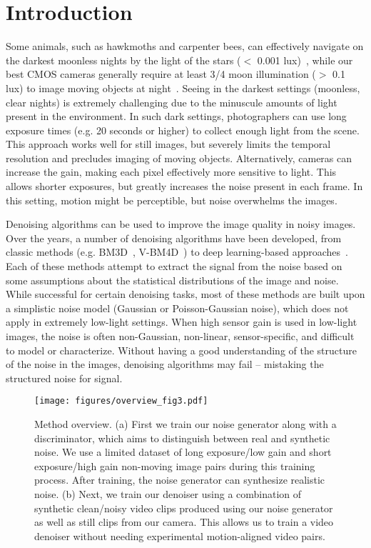 \documentclass[final]{cvpr}
\begin{document}
\section{Introduction}
Some animals, such as hawkmoths and carpenter bees, can effectively navigate on the darkest moonless nights by the light of the stars ($<$ 0.001 lux)~\cite{somanathan2008visual, warrant2004vision, kelber2002scotopic}, while our best CMOS cameras generally require at least 3/4 moon illumination ($>$ 0.1 lux) to image moving objects at night~\cite{nightonearth}. Seeing in the darkest settings (moonless, clear nights) is extremely challenging due to the minuscule amounts of light present in the environment. In such dark settings, photographers can use long exposure times (e.g. 20 seconds or higher) to collect enough light from the scene. This approach works well for still images, but severely limits the temporal resolution and precludes imaging of moving objects. Alternatively, cameras can increase the gain, making each pixel effectively more sensitive to light. This allows shorter exposures, but greatly increases the noise present in each frame. In this setting, motion might be perceptible, but noise overwhelms the images.

Denoising algorithms can be used to improve the image quality in noisy images. Over the years, a number of denoising algorithms have been developed, from classic methods (e.g. BM3D~\cite{dabov2007image}, V-BM4D~\cite{maggioni2012video}) to deep learning-based approaches~\cite{zhang2017beyond}. Each of these methods attempt to extract the signal from the noise based on some assumptions about the statistical distributions of the image and noise. While successful for certain denoising tasks, most of these methods are built upon a simplistic noise model (Gaussian or Poisson-Gaussian noise), which does not apply in extremely low-light settings. When high sensor gain is used in low-light images, the noise is often non-Gaussian, non-linear, sensor-specific, and difficult to model or characterize. Without having a good understanding of the structure of the noise in the images, denoising algorithms may fail -- mistaking the structured noise for signal. 

\begin{figure*}[!t]
\centering
\texttt{[image: figures/overview\_fig3.pdf]}
   \caption{Method overview. (a) First we train our noise generator along with a discriminator, which aims to distinguish between real and synthetic noise. We use a limited dataset of long exposure/low gain and short exposure/high gain non-moving image pairs during this training process. After training, the noise generator can synthesize realistic noise. (b) Next, we train our denoiser using a combination of synthetic clean/noisy video clips produced using our noise generator as well as still clips from our camera. This allows us to train a video denoiser without needing experimental motion-aligned video pairs.}
\label{fig:overview}
\vspace{-4mm}
\end{figure*}
\end{document}
